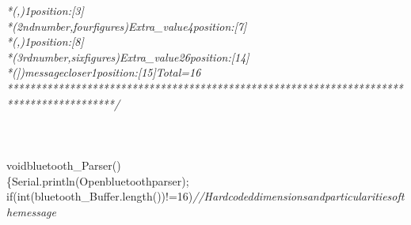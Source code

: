 \documentclass[a4paper, 12pt]{article}
\newcommand\SPC{\hspace*{0.6em}}
\newcommand\TAB{\hspace*{1.2em}}
\newcommand\QOT{\mbox{\char 34}}
\newcommand{\CppAComment}[1]{\textit{\textcolor[rgb]{0.2,0.4,1}{#1}}}
\newcommand{\CppAIdentifier}[1]{\textcolor[rgb]{0,1,0}{#1}}
\newcommand{\CppANumber}[1]{\textcolor[rgb]{0,0,1}{#1}}
\newcommand{\CppAReservedWord}[1]{\textcolor[rgb]{0,0.5,0}{#1}}
\newcommand{\CppASpace}[1]{\textcolor[rgb]{1,1,1}{\colorbox[rgb]{0,0,0}{#1}}}
\newcommand{\CppAString}[1]{\textcolor[rgb]{0.76,0.76,0.76}{#1}}
\newcommand{\CppASymbol}[1]{\textcolor[rgb]{1,0,0}{#1}}
\begin{document}
\begin{ttfamily}
\CppAComment{\SPC *\SPC (,)\SPC \SPC \SPC \SPC \SPC \SPC \SPC \SPC \SPC \SPC \SPC \SPC \SPC \SPC \SPC \SPC \SPC \SPC \SPC \SPC \SPC \SPC \SPC \SPC \SPC \SPC \SPC \SPC \SPC \SPC \SPC \SPC \SPC \SPC \SPC \SPC \SPC \SPC \SPC \SPC \SPC \SPC \SPC \SPC \SPC \SPC \SPC \SPC \SPC \SPC \SPC \SPC \SPC \SPC \SPC \SPC \SPC \SPC \SPC \SPC \SPC \SPC \SPC \SPC \SPC \SPC \SPC \SPC 1\SPC position\SPC :\SPC [3]}\\
\CppAComment{\SPC *\SPC (2nd\SPC number\SPC ,\SPC four\SPC figures)\SPC Extra\_value\SPC \SPC \SPC \SPC \SPC \SPC \SPC \SPC \SPC \SPC \SPC \SPC \SPC \SPC \SPC \SPC \SPC \SPC \SPC \SPC \SPC \SPC \SPC \SPC \SPC \SPC \SPC \SPC \SPC \SPC \SPC \SPC 4\SPC position\SPC :\SPC [7]}\\
\CppAComment{\SPC *\SPC (,)\TAB \TAB \TAB \TAB \TAB \TAB \TAB \TAB \TAB \TAB \TAB \TAB \TAB \TAB \TAB \TAB \TAB \SPC \SPC \SPC \SPC \SPC \SPC \SPC \SPC \SPC \SPC \SPC \SPC \SPC \SPC \SPC \SPC \SPC \SPC \SPC \SPC \SPC \SPC \SPC \SPC \SPC \SPC \SPC \SPC \SPC \SPC \SPC \SPC \SPC \SPC 1\SPC position\SPC :\SPC [8]}\\
\CppAComment{\SPC *\SPC (3rd\SPC number\SPC ,\SPC six\SPC figures)\SPC Extra\_value2\SPC \SPC \SPC \SPC \SPC \SPC \SPC \SPC \SPC \SPC \SPC \SPC \SPC \SPC \SPC \SPC \SPC \SPC \SPC \SPC \SPC \SPC \SPC \SPC \SPC \SPC \SPC \SPC \SPC \SPC \SPC \SPC 6\SPC position\SPC :\SPC [14]}\\
\CppAComment{\SPC *\SPC (])\SPC message\SPC closer\SPC \SPC \SPC \SPC \SPC \SPC \SPC \SPC \SPC \SPC \SPC \SPC \SPC \SPC \SPC \SPC \SPC \SPC \SPC \SPC \SPC \SPC \SPC \SPC \SPC \SPC \SPC \SPC \SPC \SPC \SPC \SPC \SPC \SPC \SPC \SPC \SPC \SPC \SPC \SPC \SPC \SPC \SPC \SPC \SPC \SPC \SPC \SPC \SPC \SPC \SPC \SPC \SPC 1\SPC position\SPC :\SPC [15]\SPC Total\SPC =\SPC 16}\\
\CppAComment{\SPC *****************************************************************************************/}\\
\\
\\
\\
\CppAReservedWord{void}\CppASpace{\SPC }\CppAIdentifier{bluetooth\_Parser}\CppASymbol{(}\CppASymbol{)}\\
\CppASymbol{\{}\CppASpace{\SPC }\CppAIdentifier{Serial}\CppASymbol{.}\CppAIdentifier{println}\CppASymbol{(}\CppAString{\QOT Open\SPC bluetooth\SPC parser\QOT }\CppASymbol{)}\CppASymbol{;}\\
\CppASpace{\SPC \SPC }\CppAReservedWord{if}\CppASpace{\SPC }\CppASymbol{(}\CppAReservedWord{int}\CppASymbol{(}\CppAIdentifier{bluetooth\_Buffer}\CppASymbol{.}\CppAIdentifier{length}\CppASymbol{(}\CppASymbol{)}\CppASymbol{)}\CppASymbol{!=}\CppANumber{16}\CppASymbol{)}\CppASpace{\SPC }\CppAComment{//Hard\SPC coded\SPC dimensions\SPC and\SPC particularities\SPC of\SPC the\SPC message}\\

\end{ttfamily}
\end{document}
